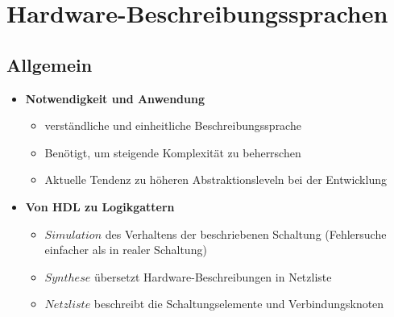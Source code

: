 \documentclass[11pt,a4paper]{article}
\begin{document}

\section{Hardware-Beschreibungssprachen}


\subsection{Allgemein}
\begin{itemize}

\item \textbf{Notwendigkeit und Anwendung}
	\begin{itemize}
	\item verständliche und einheitliche Beschreibungssprache
	\item Benötigt, um steigende Komplexität zu beherrschen
	\item Aktuelle Tendenz zu höheren Abstraktionsleveln bei der Entwicklung
	\end{itemize}
	
\item \textbf{Von HDL zu Logikgattern}
	\begin{itemize}
	\item $Simulation$ des Verhaltens der beschriebenen Schaltung (Fehlersuche einfacher als in realer Schaltung)
	\item $Synthese$ übersetzt Hardware-Beschreibungen in Netzliste
	\item $Netzliste$ beschreibt die Schaltungselemente und Verbindungsknoten
	\end{itemize}
\end{itemize}
\end{document}
